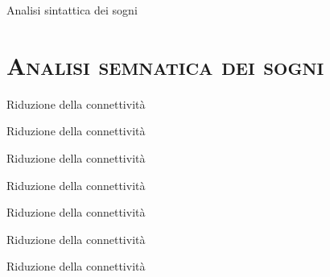 \documentclass[xcolor=x11names,compress]{beamer}
\begin{document}
\begin{frame}[t]{Analisi sintattica dei sogni}
    \vspace{-0.5cm}
    
\end{frame}

\section{\scshape Analisi semnatica dei sogni}
\begin{frame}[t]{Riduzione della connettività}
    
\end{frame}

\begin{frame}[t]{Riduzione della connettività}
    
\end{frame}

\begin{frame}[t]{Riduzione della connettività}
    
\end{frame}

\begin{frame}[t]{Riduzione della connettività}
    
\end{frame}

\begin{frame}[t]{Riduzione della connettività}
    
\end{frame}

\begin{frame}[t]{Riduzione della connettività}
    
\end{frame}

\begin{frame}[t]{Riduzione della connettività}
    
\end{frame}
\end{document}
